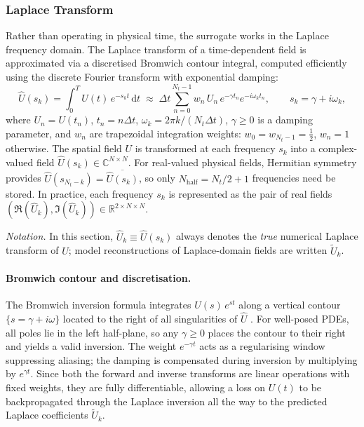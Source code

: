 \documentclass[a4paper]{article}
\newcommand{\R}{\mathbb{R}}
\newcommand{\C}{\mathbb{C}}
\begin{document}
\subsubsection{Laplace Transform}
\label{sec:laplace_transform}

Rather than operating in physical time, the surrogate works in the Laplace frequency domain. The Laplace transform of a time-dependent field is approximated via a discretised Bromwich contour integral, computed efficiently using the discrete Fourier transform with exponential damping:
\begin{equation}
    \hat{U}(s_k) = \int_0^T U(t)\,e^{-s_k t}\,\mathrm{d}t
    \;\approx\; \Delta t \sum_{n=0}^{N_t-1} w_n\, U_n\, e^{-\gamma t_n} e^{-i\omega_k t_n},
    \qquad s_k = \gamma + i\omega_k,
    \label{eq:laplace}
\end{equation}
where $U_n = U(t_n)$, $t_n = n\Delta t$, $\omega_k = 2\pi k/(N_t \Delta t)$, $\gamma \geq 0$ is a damping parameter, and $w_n$ are trapezoidal integration weights: $w_0 = w_{N_t-1} = \tfrac{1}{2}$, $w_n = 1$ otherwise. The spatial field $U$ is transformed at each frequency $s_k$ into a complex-valued field $\hat{U}(s_k) \in \C^{N \times N}$. For real-valued physical fields, Hermitian symmetry provides $\hat{U}(s_{N_t-k}) = \overline{\hat{U}(s_k)}$, so only $N_{\mathrm{half}} = N_t/2 + 1$ frequencies need be stored. In practice, each frequency $s_k$ is represented as the pair of real fields $(\Re(\hat{U}_k), \Im(\hat{U}_k)) \in \R^{2 \times N \times N}$.

\emph{Notation.} In this section, $\hat{U}_k \equiv \hat{U}(s_k)$ always denotes the \emph{true} numerical Laplace transform of $U$; model reconstructions of Laplace-domain fields are written $\tilde{U}_k$.

\paragraph{Bromwich contour and discretisation.}
The Bromwich inversion formula integrates $\hat{U}(s)\,e^{st}$ along a vertical contour $\{s = \gamma + i\omega\}$ located to the right of all singularities of $\hat{U}$ \cite{abate1992fourier}. For well-posed PDEs, all poles lie in the left half-plane, so any $\gamma \geq 0$ places the contour to their right and yields a valid inversion. The weight $e^{-\gamma t}$ acts as a regularising window suppressing aliasing; the damping is compensated during inversion by multiplying by $e^{\gamma t}$. Since both the forward and inverse transforms are linear operations with fixed weights, they are fully differentiable, allowing a loss on $U(t)$ to be backpropagated through the Laplace inversion all the way to the predicted Laplace coefficients $\tilde{U}_k$.
\label{par:differentiability}
\end{document}
